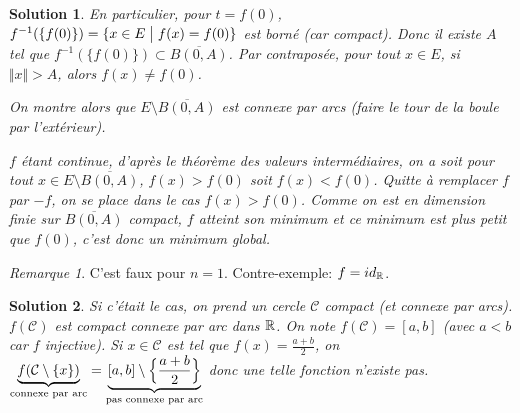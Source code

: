 \documentclass[12pt]{article}
\newtheorem{solution}{Solution}[section]
\theoremstyle{remark}
\newtheorem{remark}{Remarque}[section]
\begin{document}
\begin{solution}
	En particulier, pour $t=f(0)$, $f^{-1}(\{f(0)\})=\{x\in E\bigm| f(x)=f(0)\}$ est borné (car compact). Donc il existe $A$ tel que $f^{-1}(\{f(0)\})\subset\overline{B(0,A)}$. Par contraposée, pour tout $x\in E$, si $\Vert x\Vert>A$, alors $f(x)\neq f(0)$.

	On montre alors que $E\setminus\overline{B(0,A)}$ est connexe par arcs (faire le tour de la boule par l'extérieur).

	$f$ étant continue, d'après le théorème des valeurs intermédiaires, on a soit pour tout $x\in E\setminus\overline{B(0,A)}$, $f(x)>f(0)$ soit $f(x)<f(0)$. Quitte à remplacer $f$ par $-f$, on se place dans le cas $f(x)>f(0)$. Comme on est en dimension finie sur $\overline{B(0,A)}$ compact, $f$ atteint son minimum et ce minimum est plus petit que $f(0)$, c'est donc un minimum global.
\end{solution}

\begin{remark}
	C'est faux pour $n=1$. Contre-exemple: $f=id_{\mathbb{R}}$.
\end{remark}

\begin{solution}
	Si c'était le cas, on prend un cercle $\mathcal{C}$ compact (et connexe par arcs). $f(\mathcal{C})$ est compact connexe par arc dans $\mathbb{R}$. On note $f(\mathcal{C})=[a,b]$ (avec $a<b$ car $f$ injective). Si $x\in\mathcal{C}$ est tel que $f(x)=\frac{a+b}{2}$, on $\underbrace{f(\mathcal{C}\setminus\{x\})}_{\text{connexe par arc}}=\underbrace{[a,b]\setminus\Bigl\{\frac{a+b}{2}\Bigr\}}_{\text{pas connexe par arc}}$ donc une telle fonction n'existe pas.
\end{solution}
\end{document}
